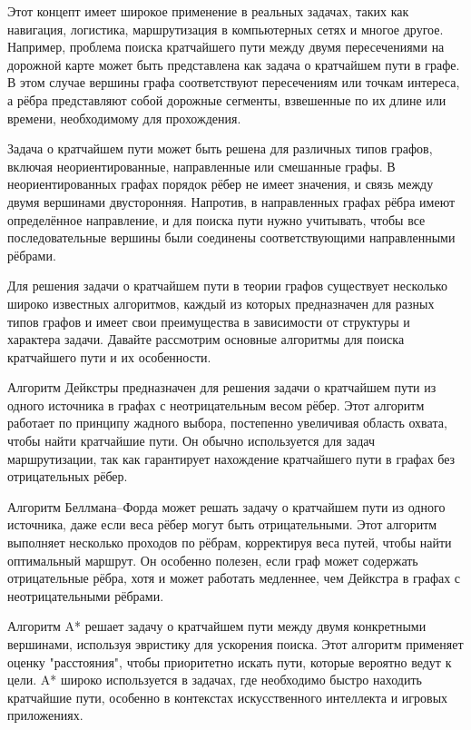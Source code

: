 Этот концепт имеет широкое применение в реальных задачах, таких как навигация, логистика, маршрутизация в компьютерных сетях и многое другое. Например, проблема поиска кратчайшего пути между двумя пересечениями на дорожной карте может быть представлена как задача о кратчайшем пути в графе. В этом случае вершины графа соответствуют пересечениям или точкам интереса, а рёбра представляют собой дорожные сегменты, взвешенные по их длине или времени, необходимому для прохождения.

Задача о кратчайшем пути может быть решена для различных типов графов, включая неориентированные, направленные или смешанные графы. В неориентированных графах порядок рёбер не имеет значения, и связь между двумя вершинами двусторонняя. Напротив, в направленных графах рёбра имеют определённое направление, и для поиска пути нужно учитывать, чтобы все последовательные вершины были соединены соответствующими направленными рёбрами.

Для решения задачи о кратчайшем пути в теории графов существует несколько широко известных алгоритмов, каждый из которых предназначен для разных типов графов и имеет свои преимущества в зависимости от структуры и характера задачи. Давайте рассмотрим основные алгоритмы для поиска кратчайшего пути и их особенности.

Алгоритм Дейкстры предназначен для решения задачи о кратчайшем пути из одного источника в графах с неотрицательным весом рёбер. Этот алгоритм работает по принципу жадного выбора, постепенно увеличивая область охвата, чтобы найти кратчайшие пути. Он обычно используется для задач маршрутизации, так как гарантирует нахождение кратчайшего пути в графах без отрицательных рёбер.

Алгоритм Беллмана–Форда может решать задачу о кратчайшем пути из одного источника, даже если веса рёбер могут быть отрицательными. Этот алгоритм выполняет несколько проходов по рёбрам, корректируя веса путей, чтобы найти оптимальный маршрут. Он особенно полезен, если граф может содержать отрицательные рёбра, хотя и может работать медленнее, чем Дейкстра в графах с неотрицательными рёбрами.

Алгоритм A* решает задачу о кратчайшем пути между двумя конкретными вершинами, используя эвристику для ускорения поиска. Этот алгоритм применяет оценку "расстояния", чтобы приоритетно искать пути, которые вероятно ведут к цели. A* широко используется в задачах, где необходимо быстро находить кратчайшие пути, особенно в контекстах искусственного интеллекта и игровых приложениях.

